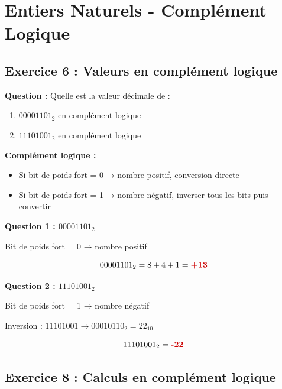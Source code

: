\documentclass[12pt,a4paper]{article}
\begin{document}
\newpage
\section{Entiers Naturels - Complément Logique}

\subsection{Exercice 6 : Valeurs en complément logique}

\begin{exercice}
\textbf{Question :} Quelle est la valeur décimale de :
\begin{enumerate}
    \item $00001101_2$ en complément logique
    \item $11101001_2$ en complément logique
\end{enumerate}
\end{exercice}

\begin{methode}
\textbf{Complément logique :}
\begin{itemize}
    \item Si bit de poids fort = 0 → nombre positif, conversion directe
    \item Si bit de poids fort = 1 → nombre négatif, inverser tous les bits puis convertir
\end{itemize}
\end{methode}

\begin{solution}
\textbf{Question 1 : $00001101_2$}

Bit de poids fort = 0 → nombre positif

$$00001101_2 = 8 + 4 + 1 = \textcolor{importantrouge}{\textbf{+13}}$$
\end{solution}

\begin{solution}
\textbf{Question 2 : $11101001_2$}

Bit de poids fort = 1 → nombre négatif

Inversion : $11101001 \rightarrow 00010110_2 = 22_{10}$

$$11101001_2 = \textcolor{importantrouge}{\textbf{-22}}$$
\end{solution}

\newpage
\subsection{Exercice 8 : Calculs en complément logique}
\end{document}
